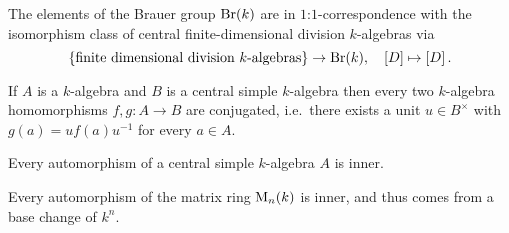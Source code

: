 \begin{corollary}
  The elements of the Brauer group $\operatorname{Br}(k)$ are in $1$:$1$-correspondence with the isomorphism class of central finite-dimensional division $k$-algebras via
  \[
    \{ \text{finite dimensional division $k$-algebras} \}
    \to
    \operatorname{Br}(k),
    \quad   [D]
    \mapsto [D] \,.
  \]
\end{corollary}


\begin{proposition}
  If $A$ is a $k$-algebra and $B$ is a central simple $k$-algebra then every two $k$-algebra homomorphisms $f, g \colon A \to B$ are conjugated, i.e.\ there exists a unit $u \in B^\times$ with $g(a) = u f(a) u^{-1}$ for every $a \in A$.
\end{proposition}


\begin{corollary}
  Every automorphism of a central simple $k$-algebra $A$ is inner.
\end{corollary}


\begin{example}
  Every automorphism of the matrix ring $\operatorname{M}_n(k)$ is inner, and thus comes from a base change of $k^n$.
\end{example}




